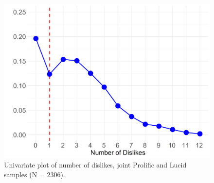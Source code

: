 \documentclass[12pt]{article}
\begin{document}
\begin{figure}[ht!]
        \includegraphics[width=1.0\textwidth]{Plots/uni-dist-cat-tol.png}
    \caption{Univariate plot of number of dislikes, joint Prolific and Lucid samples (N = 2306).}
    \label{fig:main}
\end{figure}
\end{document}
